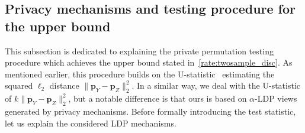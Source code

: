 \documentclass[twoside,11pt]{article}
\newcommand{\rvTwo}{Y}
\newcommand{\rvThree}{Z}
\newcommand{\alphabetSize}{k} %
\newcommand{\probVec}{\mathbf{p}} %
\newcommand{\privacyParameter}{\alpha} %
\begin{document}
\subsection{Privacy mechanisms and testing procedure for the upper bound}\label{subsection:twosample_disc_upperbound}
This subsection is dedicated to explaining the private permutation testing procedure which achieves the upper bound stated in~\eqref{rate:twosample_disc}. As mentioned earlier, this procedure builds on the U-statistic~\citep{kim_minimax_2022} estimating the squared $\ell_2$ distance $\| \probVec_\rvTwo - \probVec_\rvThree \|_2^2$.
In a similar way, we deal with the U-statistic of $\alphabetSize \| \probVec_\rvTwo - \probVec_\rvThree \|_2^2$, but a notable difference is that ours is based on $\privacyParameter$-LDP views generated by privacy mechanisms. Before formally introducing the test statistic, let us explain the considered LDP mechanisms.
\end{document}
